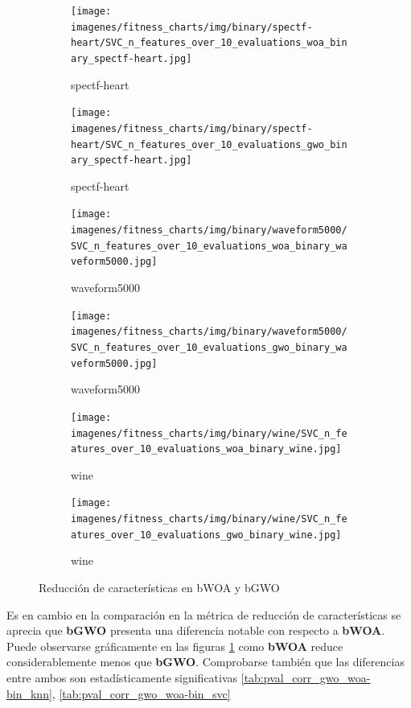 \begin{figure}[htp]
    \centering
    \begin{subfigure}[htp]{0.45\textwidth}
        \texttt{[image: imagenes/fitness\_charts/img/binary/spectf-heart/SVC\_n\_features\_over\_10\_evaluations\_woa\_binary\_spectf-heart.jpg]}
        \caption{spectf-heart}
    \end{subfigure}
    \begin{subfigure}[htp]{0.45\textwidth}
        \texttt{[image: imagenes/fitness\_charts/img/binary/spectf-heart/SVC\_n\_features\_over\_10\_evaluations\_gwo\_binary\_spectf-heart.jpg]}
        \caption{spectf-heart}
    \end{subfigure}

    \begin{subfigure}[htp]{0.45\textwidth}
        \texttt{[image: imagenes/fitness\_charts/img/binary/waveform5000/SVC\_n\_features\_over\_10\_evaluations\_woa\_binary\_waveform5000.jpg]}
        \caption{waveform5000}
    \end{subfigure}
    \begin{subfigure}[htp]{0.45\textwidth}
        \texttt{[image: imagenes/fitness\_charts/img/binary/waveform5000/SVC\_n\_features\_over\_10\_evaluations\_gwo\_binary\_waveform5000.jpg]}
        \caption{waveform5000}
    \end{subfigure}

    \begin{subfigure}[htp]{0.45\textwidth}
        \texttt{[image: imagenes/fitness\_charts/img/binary/wine/SVC\_n\_features\_over\_10\_evaluations\_woa\_binary\_wine.jpg]}
        \caption{wine}
    \end{subfigure}
    \begin{subfigure}[htp]{0.45\textwidth}
        \texttt{[image: imagenes/fitness\_charts/img/binary/wine/SVC\_n\_features\_over\_10\_evaluations\_gwo\_binary\_wine.jpg]}
        \caption{wine}
    \end{subfigure}
    \caption{Reducción de características en bWOA y bGWO}
    \label{fig:svc_selected_rate_gwo_woa_bin}
\end{figure}

Es en cambio en la comparación en la métrica de reducción de características se aprecia que \textbf{bGWO} presenta una diferencia notable con respecto a \textbf{bWOA}. Puede observarse gráficamente en las figuras \ref{fig:svc_selected_rate_gwo_woa_bin} como \textbf{bWOA} reduce considerablemente menos que \textbf{bGWO}. Comprobarse también que las diferencias entre ambos son estadísticamente significativas \ref{tab:pval_corr_gwo_woa-bin_knn}, \ref{tab:pval_corr_gwo_woa-bin_svc}

